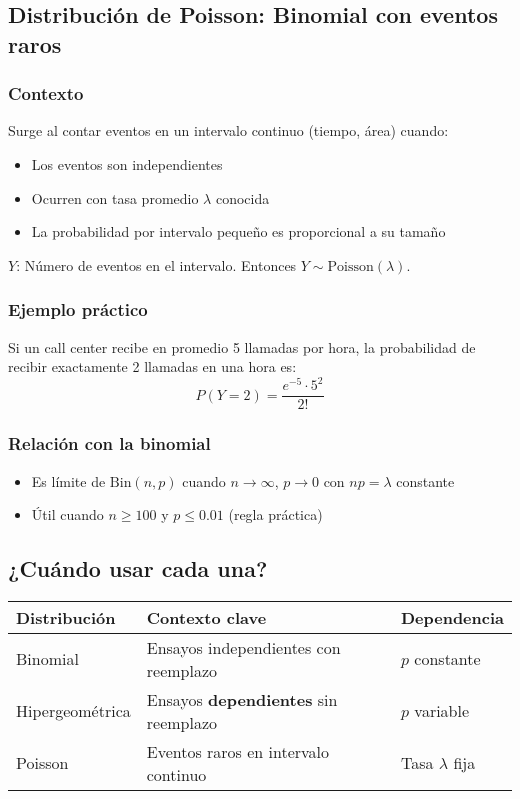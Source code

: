 \documentclass[letterpaper, 12pt]{article}
\begin{document}
	\subsection{Distribución de Poisson: Binomial con eventos raros}
	
	\subsubsection{Contexto}
	Surge al contar eventos en un intervalo continuo (tiempo, área) cuando:
	\begin{itemize}
		\item Los eventos son independientes
		\item Ocurren con tasa promedio $\lambda$ conocida
		\item La probabilidad por intervalo pequeño es proporcional a su tamaño
	\end{itemize}
	
	$Y$: Número de eventos en el intervalo. Entonces $Y \sim \text{Poisson}(\lambda)$.
	
	\subsubsection{Ejemplo práctico}
	Si un call center recibe en promedio 5 llamadas por hora, la probabilidad de recibir exactamente 2 llamadas en una hora es:
	\[
	P(Y=2) = \frac{e^{-5} \cdot 5^2}{2!}
	\]
	
	\subsubsection{Relación con la binomial}
	\begin{itemize}
		\item Es límite de $\text{Bin}(n,p)$ cuando $n \to \infty$, $p \to 0$ con $np = \lambda$ constante
		\item Útil cuando $n \geq 100$ y $p \leq 0.01$ (regla práctica)
	\end{itemize}
	
	\subsection{¿Cuándo usar cada una?}
	\begin{center}
		\begin{tabular}{|l|l|l|}
			\hline
			\textbf{Distribución} & \textbf{Contexto clave} & \textbf{Dependencia} \\ \hline
			Binomial & Ensayos independientes con reemplazo & $p$ constante \\ \hline
			Hipergeométrica & Ensayos \textbf{dependientes} sin reemplazo & $p$ variable \\ \hline
			Poisson & Eventos raros en intervalo continuo & Tasa $\lambda$ fija \\ \hline
		\end{tabular}
	\end{center}
	
\end{document}

